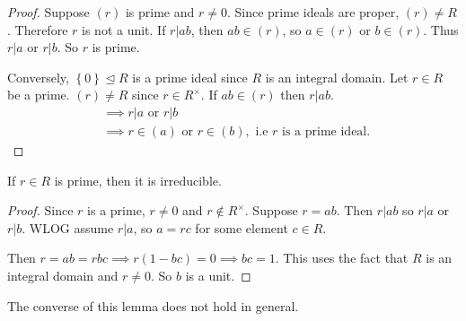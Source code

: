 \documentclass[egregdoesnotlikesansseriftitles,a4paper]{scrartcl}
\begin{document}
\begin{proof}
       Suppose $(r)$ is prime and $r \neq 0$. Since prime ideals are proper, $(r) \neq R$. Therefore $r$ is not a unit. If $r|ab$, then $ab \in (r)$, so $a \in (r)$ or $b \in (r)$. Thus $r|a$ or $r|b$. So $r $ is prime.

       Conversely, $\left\{0\right\}\unlhd R$ is a prime ideal since $R$ is an integral domain. Let $r \in R$ be a prime. $(r)\neq R$ since $r \in R^{\times }$. If $ab \in (r)$ then $r|ab$. 
       \begin{align*}
             &\implies r|a \text{ or } r|b\\
             &\implies r \in (a) \text{ or } r \in (b), \text{ i.e } r \text{ is a prime ideal. }
       \end{align*}
\end{proof}
\begin{lemma}
       If $r \in R$ is prime, then it is irreducible.
\end{lemma}
\begin{proof}
       Since $r$ is a prime, $r \neq 0$ and $r \notin R^{\times}$. Suppose $r=ab$. Then $r|ab$ so $r|a$ or $r|b$. WLOG assume $r|a$, so $a=rc $ for some element $c \in R$.

       Then $r=ab=rbc \implies r (1-bc)=0 \implies bc=1$. This uses the fact that $R$ is an integral domain and $r \neq 0$. So $b$ is a unit.
\end{proof}
The converse of this lemma does not hold in general.
\end{document}
